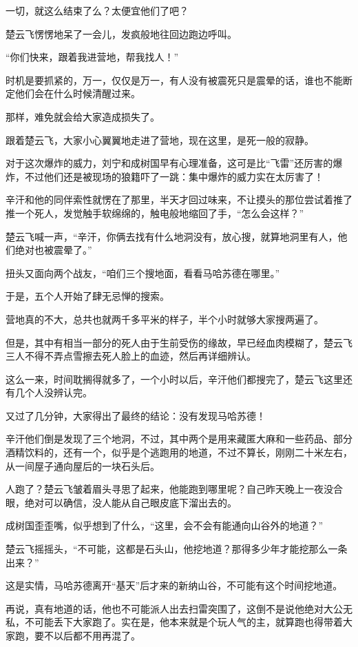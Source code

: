 一切，就这么结束了么？太便宜他们了吧？

楚云飞愣愣地呆了一会儿，发疯般地往回边跑边呼叫。

“你们快来，跟着我进营地，帮我找人！”

时机是要抓紧的，万一，仅仅是万一，有人没有被震死只是震晕的话，谁也不能断定他们会在什么时候清醒过来。

那样，难免就会给大家造成损失了。

跟着楚云飞，大家小心翼翼地走进了营地，现在这里，是死一般的寂静。

对于这次爆炸的威力，刘宁和成树国早有心理准备，这可是比“飞雷”还厉害的爆炸，不过他们还是被现场的狼籍吓了一跳：集中爆炸的威力实在太厉害了！

辛汗和他的同伴索性就愣在了那里，半天才回过味来，不让摸头的那位尝试着推了推一个死人，发觉触手软绵绵的，触电般地缩回了手，“怎么会这样？”

楚云飞喊一声，“辛汗，你俩去找有什么地洞没有，放心搜，就算地洞里有人，他们绝对也被震晕了。”

扭头又面向两个战友，“咱们三个搜地面，看看马哈苏德在哪里。”

于是，五个人开始了肆无忌惮的搜索。

营地真的不大，总共也就两千多平米的样子，半个小时就够大家搜两遍了。

但是，其中有相当一部分的死人由于生前受伤的缘故，早已经血肉模糊了，楚云飞三人不得不弄点雪擦去死人脸上的血迹，然后再详细辨认。

这么一来，时间耽搁得就多了，一个小时以后，辛汗他们都搜完了，楚云飞这里还有几个人没辨认完。

又过了几分钟，大家得出了最终的结论：没有发现马哈苏德！

辛汗他们倒是发现了三个地洞，不过，其中两个是用来藏匿大麻和一些药品、部分酒精饮料的，还有一个，似乎是个逃跑用的地道，不过不算长，刚刚二十米左右，从一间屋子通向屋后的一块石头后。

人跑了？楚云飞皱着眉头寻思了起来，他能跑到哪里呢？自己昨天晚上一夜没合眼，绝对可以确信，没人能从自己眼皮底下溜出去的。

成树国歪歪嘴，似乎想到了什么，“这里，会不会有能通向山谷外的地道？”

楚云飞摇摇头，“不可能，这都是石头山，他挖地道？那得多少年才能挖那么一条出来？”

这是实情，马哈苏德离开“基天”后才来的新纳山谷，不可能有这个时间挖地道。

再说，真有地道的话，他也不可能派人出去扫雷突围了，这倒不是说他绝对大公无私，不可能丢下大家跑了。实在是，他本来就是个玩人气的主，就算跑也得带着大家跑，要不以后都不用再混了。

